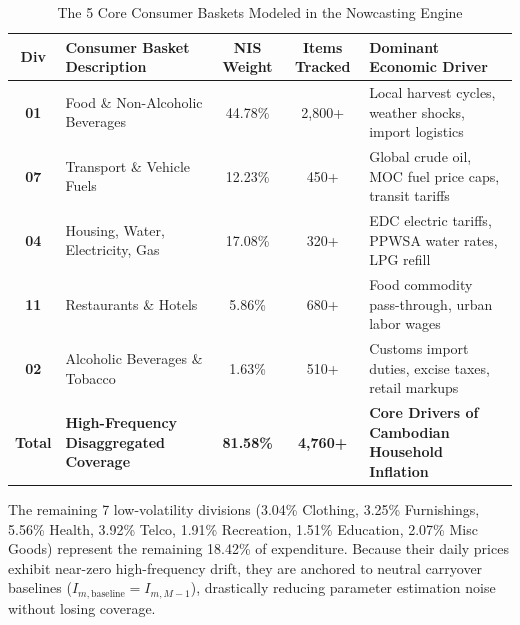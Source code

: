 \documentclass[11pt,a4paper,oneside]{article}
\begin{document}
\begin{table}[h]
\centering
\small
\caption{The 5 Core Consumer Baskets Modeled in the Nowcasting Engine}
\begin{tabular}{clccp{5.5cm}}
\toprule
\textbf{Div} & \textbf{Consumer Basket Description} & \textbf{NIS Weight} & \textbf{Items Tracked} & \textbf{Dominant Economic Driver} \\
\midrule
\textbf{01} & Food \& Non-Alcoholic Beverages & 44.78\% & 2,800+ & Local harvest cycles, weather shocks, import logistics \\
\textbf{07} & Transport \& Vehicle Fuels & 12.23\% & 450+ & Global crude oil, MOC fuel price caps, transit tariffs \\
\textbf{04} & Housing, Water, Electricity, Gas & 17.08\% & 320+ & EDC electric tariffs, PPWSA water rates, LPG refill \\
\textbf{11} & Restaurants \& Hotels & 5.86\% & 680+ & Food commodity pass-through, urban labor wages \\
\textbf{02} & Alcoholic Beverages \& Tobacco & 1.63\% & 510+ & Customs import duties, excise taxes, retail markups \\
\midrule
\textbf{Total} & \textbf{High-Frequency Disaggregated Coverage} & \textbf{81.58\%} & \textbf{4,760+} & \textbf{Core Drivers of Cambodian Household Inflation} \\
\bottomrule
\end{tabular}
\end{table}

The remaining 7 low-volatility divisions (3.04\% Clothing, 3.25\% Furnishings, 5.56\% Health, 3.92\% Telco, 1.91\% Recreation, 1.51\% Education, 2.07\% Misc Goods) represent the remaining 18.42\% of expenditure. Because their daily prices exhibit near-zero high-frequency drift, they are anchored to neutral carryover baselines ($I_{m, \text{baseline}} = I_{m, M-1}$), drastically reducing parameter estimation noise without losing coverage.
\end{document}
